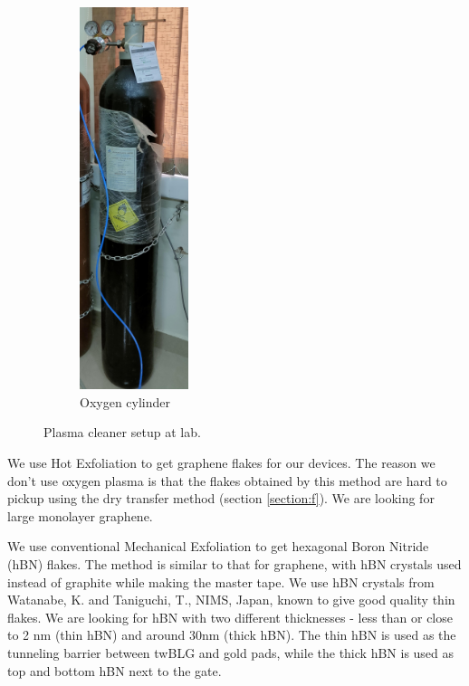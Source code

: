 \begin{figure}[H]
\begin{subfigure}{0.45\textwidth}
		\includegraphics[width=0.35\textwidth]{figures/plcl3.jpg}
		\caption{Oxygen cylinder}
	\end{subfigure}
	\caption{Plasma cleaner setup at lab.}
	\label{fig:plcl}
\end{figure}

We use Hot Exfoliation to get graphene flakes for our devices. The reason we don't use oxygen plasma is that the flakes obtained by this method are hard to pickup using the dry transfer method (section \ref{section:f}). We are looking for large monolayer graphene.

We use conventional Mechanical Exfoliation to get hexagonal Boron Nitride (hBN) flakes. The method is similar to that for graphene, with hBN crystals used instead of graphite while making the master tape. We use hBN crystals from Watanabe, K. and Taniguchi, T., NIMS, Japan, known to give good quality thin flakes. \cite{hbn} We are looking for hBN with two different thicknesses - less than or close to 2 nm (thin hBN) \cite{Chandni} and around 30nm (thick hBN). The thin hBN is used as the tunneling barrier between twBLG and gold pads, while the thick hBN is used as top and bottom hBN next to the gate.

